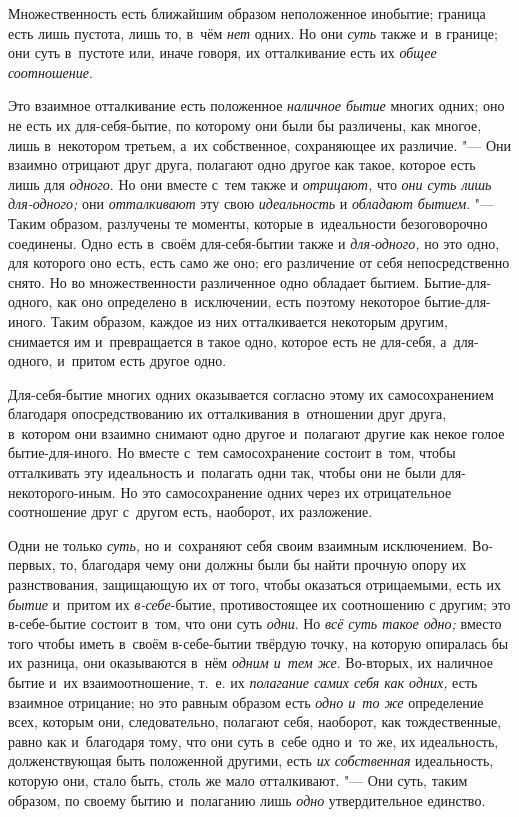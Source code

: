 Множественность есть ближайшим образом неположенное инобытие; граница есть лишь
пустота, лишь то, в~чём {\em нет} одних. Но они {\em суть} также и~в границе;
они суть в~пустоте или, иначе говоря, их отталкивание есть их
{\em общее соотношение}.

Это взаимное отталкивание есть положенное {\em наличное бытие} многих одних;
оно не есть их для-себя-бытие, по которому они были бы различены, как многое,
лишь в~некотором третьем, а~их собственное, сохраняющее их различие. "--- Они
взаимно отрицают друг друга, полагают одно другое как такое, которое есть лишь
для {\em одного}. Но они вместе с~тем также и {\em отрицают,} что
{\em они суть лишь для-одного;} они {\em отталкивают} эту свою
{\em идеальность} и {\em обладают бытием}. "--- Таким образом, разлучены те
моменты, которые в~идеальности безоговорочно соединены. Одно есть в~своём
для-себя-бытии также и {\em для-одного,} но это одно, для которого оно есть,
есть само же оно; его различение от себя непосредственно снято. Но во
множественности различенное одно обладает бытием. Бытие-для-одного, как оно
определено в~исключении, есть поэтому некоторое бытие-для-иного. Таким образом,
каждое из них отталкивается некоторым другим, снимается им и~превращается в
такое одно, которое есть не для-себя, а~для-одного, и~притом есть другое одно.

Для-себя-бытие многих одних оказывается согласно этому их самосохранением
благодаря опосредствованию их отталкивания в~отношении друг друга, в~котором
они взаимно снимают одно другое и~полагают другие как некое голое
бытие-для-иного. Но вместе с~тем самосохранение состоит в~том, чтобы
отталкивать эту идеальность и~полагать одни так, чтобы они не были
для-некоторого-иным. Но это самосохранение одних через их отрицательное
соотношение друг с~другом есть, наоборот, их разложение.

Одни не только {\em суть,} но и~сохраняют себя своим взаимным исключением.
Во-первых, то, благодаря чему они должны были бы найти прочную опору их
разнствования, защищающую их от того, чтобы оказаться отрицаемыми, есть их
{\em бытие} и~притом их {\em в-себе}-бытие, противостоящее их соотношению с
другим; это в-себе-бытие состоит в~том, что они суть {\em одни}. Но
{\em всё суть такое одно;} вместо того чтобы иметь в~своём в-себе-бытии твёрдую
точку, на которую опиралась бы их разница, они оказываются в~нём
{\em одним и~тем же}. Во-вторых, их наличное бытие и~их взаимоотношение, т.~е.
их {\em полагание самих себя как одних,} есть взаимное отрицание; но это равным
образом есть {\em одно и~то же} определение всех, которым они, следовательно,
полагают себя, наоборот, как тождественные, равно как и~благодаря тому, что они
суть в~себе одно и~то же, их идеальность, долженствующая быть положенной
другими, есть {\em их собственная} идеальность, которую они, стало быть, столь
же мало отталкивают. "--- Они суть, таким образом, по своему бытию и~полаганию
лишь {\em одно} утвердительное единство.

